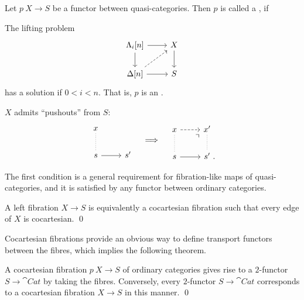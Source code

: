 \begin{definition}
    Let $p\:X\to S$ be a functor between quasi-categories.
    Then $p$ is called a , if
    \begin{itms}
        \item The lifting problem 
        \[\begin{tikzcd}
            \Lambda_i[n] \ar[d] \ar[r] & X \ar[d] \\
            \Delta[n] \ar[r] \ar[ur,dashed] & S
        \end{tikzcd}\]
        has a solution if $0<i<n$. That is, $p$ is an .
        \item $X$ admits ``pushouts'' from $S$:
        \[\begin{tikzcd}
            x\ar[d,dotted,dash] \\
            s \ar[r] & s'
        \end{tikzcd}\quad\Longrightarrow\quad\begin{tikzcd}
            x\ar[r,dashed]\ar[d,dotted,dash] & x'\ar[d,dotted,dash] \\
            s \ar[r]\ar[ur,phantom,end anchor=south west,very near end,"\urcorner"] & s'\rlap{\ .}
        \end{tikzcd}\]
    \end{itms}
\end{definition}

The first condition is a general requirement for fibration-like maps of quasi-categories,
and it is satisfied by any functor between ordinary categories.

\begin{proposition}
    A left fibration $X\to S$ is equivalently a cocartesian fibration
    such that every edge of $X$ is cocartesian. \qed
\end{proposition}

Cocartesian fibrations provide an obvious way to 
define transport functors between the fibres,
which implies the following theorem.

\begin{theorem}
    A cocartesian fibration $p\:X\to S$ of ordinary categories
    gives rise to a $2$-functor $S\to\cat{Cat}$ by taking the fibres.
    Conversely, every $2$-functor $S\to\cat{Cat}$
    corresponds to a cocartesian fibration $X\to S$ in this manner. \qed
\end{theorem}


